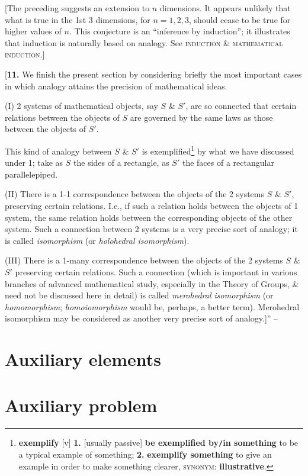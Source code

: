 \documentclass[oneside]{book}
\numberwithin{equation}{section}
\begin{document}
[The preceding suggests an extension to $n$ dimensions. It appears unlikely that what is true in the 1st 3 dimensions, for $n = 1,2,3$, should cease to be true for higher values of $n$. This conjecture is an ``inference by induction''; it illustrates that induction is naturally based on analogy. See \textsc{induction \& mathematical induction}.]

[\textbf{11.} We finish the present section by considering briefly the most important cases in which analogy attains the precision of mathematical ideas.

(I) 2 systems of mathematical objects, say $S$ \& $S'$, are so connected that certain relations between the objects of $S$ are governed by the same laws as those between the objects of $S'$.

This kind of analogy between $S$ \& $S'$ is exemplified\footnote{\textbf{exemplify} [v] \textbf{1.} [usually passive] \textbf{be exemplified by\texttt{/}in something} to be a typical example of something; \textbf{2.} \textbf{exemplify something} to give an example in order to make something clearer, \textsc{synonym}: \textbf{illustrative}.} by what we have discussed under 1; take as $S$ the sides of a rectangle, as $S'$ the faces of a rectangular parallelepiped.

(II) There is a 1-1 correspondence between the objects of the 2 systems $S$ \& $S'$, preserving certain relations. I.e., if such a relation holds between the objects of 1 system, the same relation holds between the corresponding objects of the other system. Such a connection between 2 systems is a very precise sort of analogy; it is called \textit{isomorphism} (or \textit{holohedral isomorphism}).

(III) There is a 1-many correspondence between the objects of the 2 systems $S$ \& $S'$ preserving certain relations. Such a connection (which is important in various branches of advanced mathematical study, especially in the Theory of Groups, \& need not be discussed here in detail) is called \textit{merohedral isomorphism} (or \textit{homomorphism}; \textit{homoiomorphism} would be, perhaps, a better term). Merohedral isomorphism may be considered as another very precise sort of analogy.]'' -- \cite[pp. 37--46]{Polya2014}

\section{Auxiliary elements}

\section{Auxiliary problem}
\end{document}
